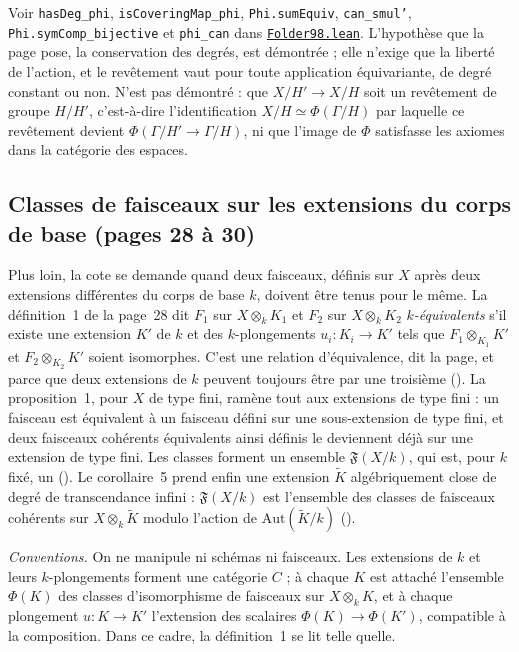 \begingroup\raggedright
\noindent Voir \texttt{hasDeg\_phi}, \texttt{isCoveringMap\_phi}, \texttt{Phi.sumEquiv}, \texttt{can\_smul'}, \texttt{Phi.symComp\_bijective} et \texttt{phi\_can} dans \href{\leanblob/CategoryTheory/Folder98.lean}{\texttt{Folder98.\allowbreak{}lean}}. L'hypothèse que la page pose, la conservation des degrés, est démontrée ; elle n'exige que la liberté de l'action, et le revêtement vaut pour toute application équivariante, de degré constant ou non. N'est pas démontré : que $X/H' \to X/H$ soit un revêtement de groupe $H/H'$, c'est-à-dire l'identification $X/H \simeq \Phi(\Gamma/H)$ par laquelle ce revêtement devient $\Phi(\Gamma/H' \to \Gamma/H)$, ni que l'image de $\Phi$ satisfasse les axiomes dans la catégorie des espaces.\par\endgroup

\subsection*{Classes de faisceaux sur les extensions du corps de base (pages 28 à 30)}

Plus loin, la cote se demande quand deux faisceaux, définis sur $X$ après deux extensions différentes du corps de base $k$, doivent être tenus pour le même. La définition~1 de la page~28 dit $F_1$ sur $X \otimes_k K_1$ et $F_2$ sur $X \otimes_k K_2$ \emph{$k$-équivalents} s'il existe une extension $K'$ de $k$ et des $k$-plongements $u_i : K_i \to K'$ tels que $F_1 \otimes_{K_1} K'$ et $F_2 \otimes_{K_2} K'$ soient isomorphes. C'est une relation d'équivalence, dit la page,  et parce que deux extensions de $k$ peuvent toujours être  par une troisième (). La proposition~1, pour $X$ de type fini, ramène tout aux extensions de type fini : un faisceau est équivalent à un faisceau défini sur une sous-extension de type fini, et deux faisceaux cohérents équivalents ainsi définis le deviennent déjà sur une extension de type fini. Les classes forment un ensemble $\mathfrak F(X/k)$, qui est, pour $k$ fixé, un  (). Le corollaire~5 prend enfin une extension $\widetilde K$ algébriquement close de degré de transcendance infini : $\mathfrak F(X/k)$ est l'ensemble des classes de faisceaux cohérents sur $X \otimes_k \widetilde K$ modulo l'action de $\mathrm{Aut}(\widetilde K/k)$ ().

\noindent\emph{Conventions.} On ne manipule ni schémas ni faisceaux. Les extensions de $k$ et leurs $k$-plongements forment une catégorie $C$ ; à chaque $K$ est attaché l'ensemble $\Phi(K)$ des classes d'isomorphisme de faisceaux sur $X \otimes_k K$, et à chaque plongement $u : K \to K'$ l'extension des scalaires $\Phi(K) \to \Phi(K')$, compatible à la composition. Dans ce cadre, la définition~1 se lit telle quelle.


